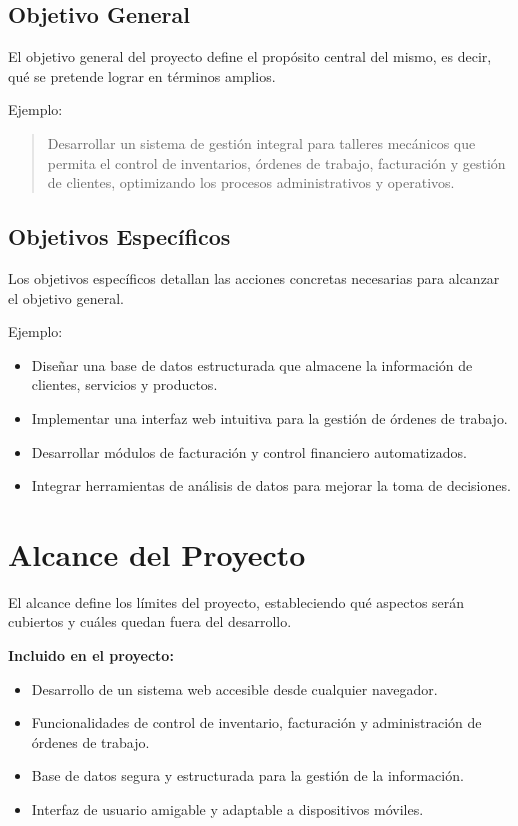 \subsection{Objetivo General}
El objetivo general del proyecto define el propósito central del mismo, es decir, qué se pretende lograr en términos amplios.

Ejemplo:
\begin{quote}
	Desarrollar un sistema de gestión integral para talleres mecánicos que permita el control de inventarios, órdenes de trabajo, facturación y gestión de clientes, optimizando los procesos administrativos y operativos.
\end{quote}

\subsection{Objetivos Específicos}
Los objetivos específicos detallan las acciones concretas necesarias para alcanzar el objetivo general.

Ejemplo:
\begin{itemize}
	\item Diseñar una base de datos estructurada que almacene la información de clientes, servicios y productos.
	\item Implementar una interfaz web intuitiva para la gestión de órdenes de trabajo.
	\item Desarrollar módulos de facturación y control financiero automatizados.
	\item Integrar herramientas de análisis de datos para mejorar la toma de decisiones.
\end{itemize}

\section{Alcance del Proyecto}

El alcance define los límites del proyecto, estableciendo qué aspectos serán cubiertos y cuáles quedan fuera del desarrollo.

\textbf{Incluido en el proyecto:}
\begin{itemize}
	\item Desarrollo de un sistema web accesible desde cualquier navegador.
	\item Funcionalidades de control de inventario, facturación y administración de órdenes de trabajo.
	\item Base de datos segura y estructurada para la gestión de la información.
	\item Interfaz de usuario amigable y adaptable a dispositivos móviles.
\end{itemize}

